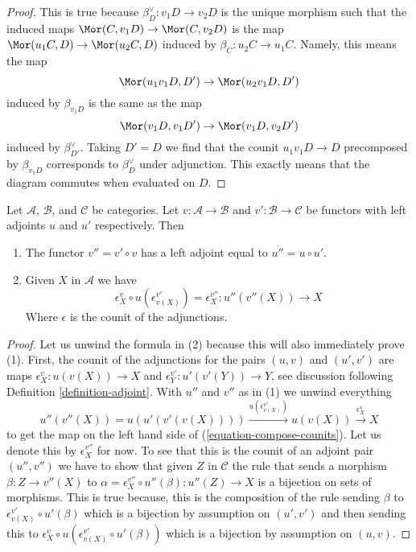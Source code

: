 \begin{proof}
This is true because $\beta^\vee_D : v_1D \to v_2D$ is the unique
morphism such that the induced maps $\Mor(C, v_1D) \to \Mor(C, v_2D)$
is the map $\Mor(u_1C, D) \to \Mor(u_2C, D)$ induced by
$\beta_C : u_2C \to u_1C$. Namely, this means the map
$$
\Mor(u_1 v_1 D, D') \to \Mor(u_2 v_1 D, D')
$$
induced by $\beta_{v_1 D}$ is the same as the map
$$
\Mor(v_1 D, v_1 D') \to \Mor(v_1 D, v_2 D')
$$
induced by $\beta^\vee_{D'}$. Taking $D' = D$ we find that the counit
$u_1 v_1 D \to D$ precomposed by $\beta_{v_1D}$ corresponds to $\beta^\vee_D$
under adjunction. This exactly means that the diagram commutes when
evaluated on $D$.
\end{proof}

\begin{lemma}
\label{lemma-compose-counits}
Let $\mathcal{A}$, $\mathcal{B}$, and $\mathcal{C}$ be categories.
Let $v : \mathcal{A} \to \mathcal{B}$ and
$v' : \mathcal{B} \to \mathcal{C}$ be functors
with left adjoints $u$ and $u'$ respectively. Then
\begin{enumerate}
\item The functor $v'' = v' \circ v$ has a left adjoint equal to
$u'' = u \circ u'$.
\item Given $X$ in $\mathcal{A}$ we have
\begin{equation}
\label{equation-compose-counits}
\epsilon_X^v \circ u(\epsilon^{v'}_{v(X)}) = \epsilon^{v''}_X :
u''(v''(X)) \to X
\end{equation}
Where $\epsilon$ is the counit of the adjunctions.
\end{enumerate}
\end{lemma}

\begin{proof}
Let us unwind the formula in (2) because this will also immediately
prove (1). First, the counit of the adjunctions for the pairs
$(u, v)$ and $(u', v')$ are maps
$\epsilon_X^v : u(v(X)) \to X$ and
$\epsilon_Y^{v'} : u'(v'(Y)) \to Y$, see discussion following
Definition \ref{definition-adjoint}.
With $u''$ and $v''$ as in (1) we unwind everything
$$
u''(v''(X)) = u(u'(v'(v(X)))) \xrightarrow{u(\epsilon_{v(X)}^{v'})}
u(v(X)) \xrightarrow{\epsilon_X^v} X
$$
to get the map on the left hand side of (\ref{equation-compose-counits}).
Let us denote this by $\epsilon_X^{v''}$ for now.
To see that this is the counit of an adjoint pair
$(u'', v'')$ we have to show that given $Z$ in $\mathcal{C}$
the rule that sends a morphism $\beta : Z \to v''(X)$
to $\alpha = \epsilon_X^{v''} \circ u''(\beta) : u''(Z) \to X$
is a bijection on sets of morphisms.
This is true because, this is the composition of the
rule sending $\beta$ to $\epsilon_{v(X)}^{v'} \circ u'(\beta)$
which is a bijection by assumption on $(u', v')$ and then
sending this to
$\epsilon_X^v \circ u(\epsilon_{v(X)}^{v'} \circ u'(\beta))$
which is a bijection by assumption on $(u, v)$.
\end{proof}






